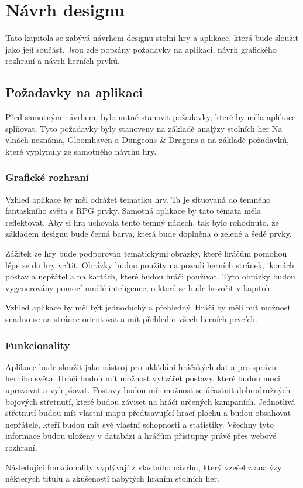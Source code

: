 \chapter{Návrh designu}
Tato kapitola se zabývá návrhem designu stolní hry a aplikace, která bude sloužit jako její součást. Jsou zde popsány požadavky na aplikaci, návrh grafického rozhraní a návrh herních prvků.

\section{Požadavky na aplikaci}
Před samotným návrhem, bylo nutné stanovit požadavky, které by měla aplikace splňovat. Tyto požadavky byly stanoveny na základě analýzy stolních her Na vlnách neznáma, Gloomhaven a Dungeons \& Dragons a na základě požadavků, které vyplynuly ze samotného návrhu hry.

\subsection{Grafické rozhraní}
Vzhled aplikace by měl odrážet tematiku hry. Ta je situovaná do temného fantaskního světa s RPG prvky. Samotná aplikace by tato témata měla reflektovat. Aby si hra uchovala tento temný nádech, tak bylo rohodnuto, že základem designu bude černá barva, která bude doplněna o zelené a šedé prvky.

Zážitek ze hry bude podporován tematickými obrázky, které hráčům pomohou lépe se do hry vcítit. Obrázky budou použity na pozadí herních stránek, ikonách postav a nepřátel a na kartách, které budou hráči používat. Tyto obrázky budou vygenerovány pomocí umělé inteligence, o které se bude hovořit v kapitole %

Vzhled aplikace by měl být jednoduchý a přehledný. Hráči by měli mít možnost snadno se na stránce orientovat a mít přehled o všech herních prvcích.

\subsection{Funkcionality}
Aplikace bude sloužit jako nástroj pro ukládání hráčských dat a pro správu herního světa. Hráči budou mít možnost vytvářet postavy, které budou moci upravovat a vylepšovat. Postavy budou mít možnost se účastnit dobrodružných bojových střetnutí, které budou záviset na hráči určených kampaních. Jednotlivá střetnutí budou mít vlastní mapu předtsavující hrací plochu a budou obsahovat nepřátele, kteří budou mít své vlastní schopnosti a statistiky. Všechny tyto informace budou uloženy v databázi a hráčům přístupny právě přes webové rozhraní.

Následující funkcionality vyplývají z vlastního návrhu, který vzešel z analýzy některých titulů a zkušeností nabytých hraním stolních her.

